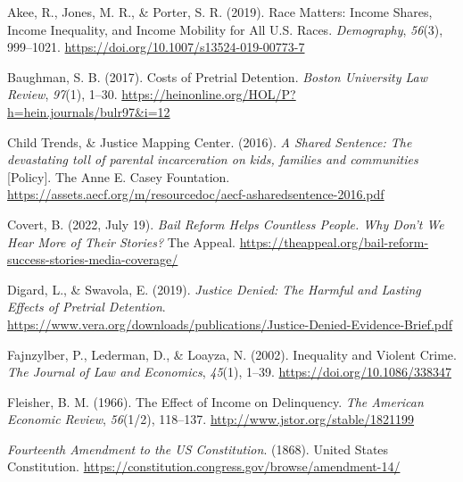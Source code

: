 \documentclass[
  letterpaper,
  DIV=11,
  numbers=noendperiod]{scrartcl}
\newlength{\cslhangindent}
\newlength{\cslentryspacingunit} %
\newenvironment{CSLReferences}[2] %
 {%
  \setlength{\parindent}{0pt}
  \ifodd #1
  \let\oldpar\par
  \def\par{\hangindent=\cslhangindent\oldpar}
  \fi
  \setlength{\parskip}{#2\cslentryspacingunit}
 }%
 {}
\begin{document}
\hypertarget{refs}{}
\begin{CSLReferences}{1}{0}
\leavevmode{}%
Akee, R., Jones, M. R., \& Porter, S. R. (2019). Race {Matters}: {Income
Shares}, {Income Inequality}, and {Income Mobility} for {All U}.{S}.
{Races}. \emph{Demography}, \emph{56}(3), 999--1021.
\url{https://doi.org/10.1007/s13524-019-00773-7}

\leavevmode{}%
Baughman, S. B. (2017). Costs of {Pretrial Detention}. \emph{Boston
University Law Review}, \emph{97}(1), 1--30.
\url{https://heinonline.org/HOL/P?h=hein.journals/bulr97\&i=12}

\leavevmode{}%
Child Trends, \& Justice Mapping Center. (2016). \emph{A {Shared
Sentence}: {The} devastating toll of parental incarceration on kids,
families and communities} {[}Policy{]}. {The Anne E. Casey Fountation}.
\url{https://assets.aecf.org/m/resourcedoc/aecf-asharedsentence-2016.pdf}

\leavevmode{}%
Covert, B. (2022, July 19). \emph{Bail {Reform Helps Countless People}.
{Why Don}'t {We Hear More} of {Their Stories}?} {The Appeal}.
\url{https://theappeal.org/bail-reform-success-stories-media-coverage/}

\leavevmode{}%
Digard, L., \& Swavola, E. (2019). \emph{Justice {Denied}: {The Harmful}
and {Lasting Effects} of {Pretrial Detention}}.
\url{https://www.vera.org/downloads/publications/Justice-Denied-Evidence-Brief.pdf}

\leavevmode{}%
Fajnzylber, P., Lederman, D., \& Loayza, N. (2002). Inequality and
{Violent Crime}. \emph{The Journal of Law and Economics}, \emph{45}(1),
1--39. \url{https://doi.org/10.1086/338347}

\leavevmode{}%
Fleisher, B. M. (1966). The {Effect} of {Income} on {Delinquency}.
\emph{The American Economic Review}, \emph{56}(1/2), 118--137.
\url{http://www.jstor.org/stable/1821199}

\leavevmode{}%
\emph{Fourteenth {Amendment} to the {US Constitution}}. (1868). {United
States Constitution}.
\url{https://constitution.congress.gov/browse/amendment-14/}


\end{CSLReferences}
\end{document}
